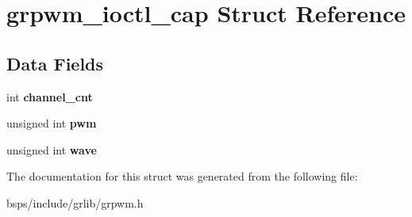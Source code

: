 \hypertarget{structgrpwm__ioctl__cap}{}\section{grpwm\+\_\+ioctl\+\_\+cap Struct Reference}
\label{structgrpwm__ioctl__cap}
\subsection*{Data Fields}
\begin{DoxyCompactItemize}
\item 
\mbox{\label{structgrpwm__ioctl__cap_a3350155ee429b4e812e35575b4246a05}} 
int {\bfseries channel\+\_\+cnt}
\item 
\mbox{\label{structgrpwm__ioctl__cap_afd32d69540f35aa425edbd39b2741804}} 
unsigned int {\bfseries pwm}
\item 
\mbox{\label{structgrpwm__ioctl__cap_a06f3eaea51108eeb92286af809ece83e}} 
unsigned int {\bfseries wave}
\end{DoxyCompactItemize}


The documentation for this struct was generated from the following file\+:\begin{DoxyCompactItemize}
\item 
bsps/include/grlib/grpwm.\+h\end{DoxyCompactItemize}
